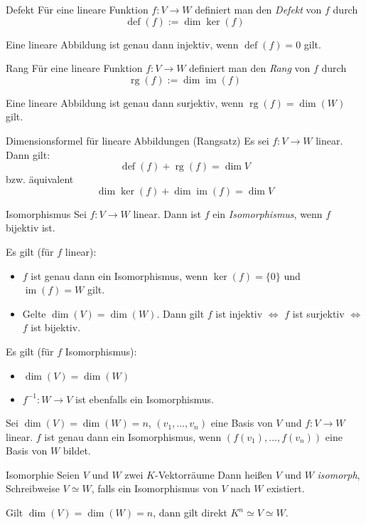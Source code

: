 \documentclass[german]{../spicker}
\newcommand{\im}{\operatorname{im}}
\newcommand{\rg}{\operatorname{rg}}
\newcommand{\defect}{\operatorname{def}}
\begin{document}
\begin{bonus}{Defekt}
    Für eine lineare Funktion $f: V\to W$ definiert man den \emph{Defekt} von $f$ durch
    $$
        \defect (f) := \dim\ker (f)
    $$

    Eine lineare Abbildung ist genau dann injektiv, wenn $\defect (f) = 0$ gilt.
\end{bonus}

\begin{defi}{Rang}
    Für eine lineare Funktion $f: V\to W$ definiert man den \emph{Rang} von $f$ durch
    $$
        \rg (f) := \dim\im (f)
    $$

    Eine lineare Abbildung ist genau dann surjektiv, wenn $\rg (f) = \dim (W)$ gilt.
\end{defi}

\begin{defi}{Dimensionsformel für lineare Abbildungen (Rangsatz)}
    Es sei $f : V \to W$ linear. Dann gilt:
    $$
        \defect (f) + \rg (f) = \dim V
    $$
    bzw. äquivalent
    $$
        \dim\ker (f) + \dim\im (f) = \dim V
    $$
\end{defi}

\begin{defi}{Isomorphismus}
    Sei $f : V \to W$ linear.
    Dann ist $f$ ein \emph{Isomorphismus}, wenn $f$ bijektiv ist.

    Es gilt (für $f$ linear):
    \begin{itemize}
        \item $f$ ist genau dann ein Isomorphismus, wenn $\ker(f) = \{0\}$ und $\im(f) = W$ gilt.
        \item Gelte $\dim (V) = \dim (W)$. Dann gilt $f$ ist injektiv $\iff$ $f$ ist surjektiv $\iff$ $f$ ist bijektiv.
    \end{itemize}

    Es gilt (für $f$ Isomorphismus):
    \begin{itemize}
        \item $\dim(V) = \dim(W)$
        \item $f^{-1} : W \to V$ ist ebenfalls ein Isomorphismus.
    \end{itemize}

    Sei $\dim(V) = \dim(W) = n$, $(v_1, \ldots, v_n)$ eine Basis von $V$ und $f : V \to W$ linear.
    $f$ ist genau dann ein Isomorphismus, wenn $(f(v_1), \ldots, f(v_n))$ eine Basis von $W$ bildet.
\end{defi}

\begin{bonus}{Isomorphie}
    Seien $V$ und $W$ zwei $K$-Vektorräume
    Dann heißen $V$ und $W$ \emph{isomorph}, Schreibweise $V \simeq W$, falls ein Isomorphismus von $V$ nach $W$ existiert.

    Gilt $\dim(V) = \dim(W) = n$, dann gilt direkt $K^n \simeq V \simeq W$.
\end{bonus}
\end{document}
